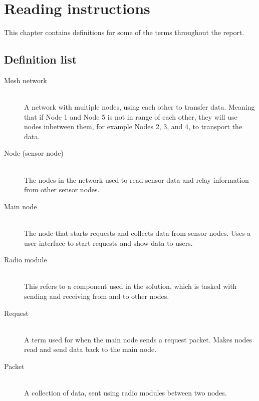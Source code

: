 \chapter{Reading instructions}

This chapter contains definitions for some of the terms throughout the report.

\section*{Definition list}

\begin{description}
\item[Mesh network] \hfill \\
A network with multiple nodes, using each other to transfer data. Meaning that if Node 1 and Node 5 is not in range of each other, they will use nodes inbetween them, for example Nodes 2, 3, and 4, to transport the data.

\item[Node (sensor node)] \hfill \\
The nodes in the network used to read sensor data and relay information from other sensor nodes.

\item[Main node] \hfill \\
The node that starts requests and collects data from sensor nodes. Uses a user interface to start requests and show data to users.

\item[Radio module] \hfill \\
This refers to a component used in the solution, which is tasked with sending and receiving from and to other nodes.

\item[Request] \hfill \\
A term used for when the main node sends a request packet. Makes nodes read and send data back to the main node.

\item[Packet] \hfill \\
A collection of data, sent using radio modules between two nodes.

\end{description}
